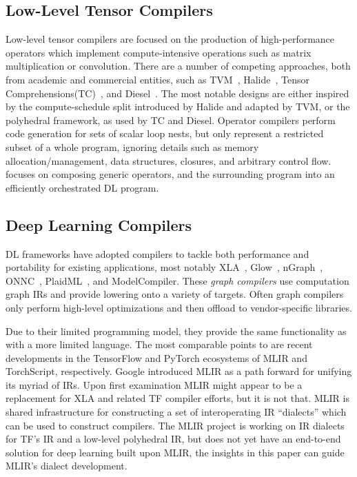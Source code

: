 \subsection{Low-Level Tensor Compilers}
Low-level tensor compilers are focused on the production
    of high-performance operators which implement compute-intensive
    operations such as matrix multiplication or convolution.
There are a number of competing approaches,
    both from academic and commercial entities, such as
    TVM~\cite{tvm_osdi18}, Halide~\cite{halide}, Tensor Comprehensions(TC)~\cite{tensor_comprehensions},
    and Diesel~\cite{diesel}.
The most notable designs are either inspired by the
    compute-schedule split introduced by Halide
    and adapted by TVM, or the polyhedral framework,
    as used by TC and Diesel.
Operator compilers perform code generation for sets of scalar loop nests,
    but only represent a restricted subset of a whole program, ignoring details such as
    memory allocation/management, data structures, closures, and arbitrary control flow.
\relay focuses on composing generic operators, and the surrounding program
    into an efficiently orchestrated DL program.

\subsection{Deep Learning Compilers}

DL frameworks have adopted compilers
    to tackle both performance and portability
    for existing applications, most notably
    XLA~\cite{xla}, Glow~\cite{glow}, nGraph~\cite{ngraph}, ONNC~\cite{onnc},
    PlaidML~\cite{plaidml}, and ModelCompiler.
These \textit{graph compilers} use computation graph IRs and provide
    lowering onto a variety of targets.
Often graph compilers only perform high-level optimizations
    and then offload to vendor-specific libraries.

Due to their limited programming model, they
    provide the same functionality as \relay with
    a more limited language.
The most comparable points to \relay are recent
    developments in the TensorFlow and PyTorch
    ecosystems of MLIR and TorchScript, respectively.
Google introduced MLIR as a path forward for
    unifying its myriad of IRs.
Upon first examination MLIR might appear to be
    a replacement for XLA and related TF compiler
    efforts, but it is not that.
MLIR is shared infrastructure for constructing
    a set of interoperating IR ``dialects'' which
    can be used to construct compilers.
The MLIR project is working on IR dialects
    for TF's IR and a low-level polyhedral IR,
    but does not yet have an end-to-end solution for
    deep learning built upon MLIR, the insights in
    this paper can guide MLIR's dialect development.

